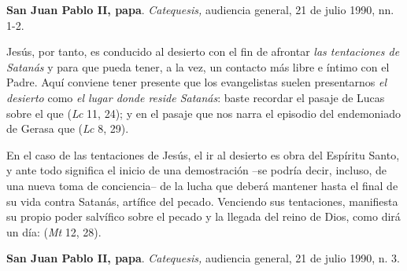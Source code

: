 \begin{patercite}\textbf{San Juan Pablo II, papa}. \textit{Catequesis,} audiencia general, 21 de julio 1990, nn. 1-2.\end{patercite}

\begin{patercite}[+] Jesús, por tanto, es conducido al desierto con el fin de afrontar \textit{las tentaciones de Satanás} y para que pueda tener, a la vez, un contacto más libre e íntimo con el Padre. Aquí conviene tener presente que los evangelistas suelen presentarnos \textit{el desierto} como \textit{el lugar donde reside Satanás}: baste recordar el pasaje de Lucas sobre el  que  (\textit{Lc} 11, 24); y en el pasaje que nos narra el episodio del endemoniado de Gerasa que  (\textit{Lc} 8, 29).\end{patercite}

\begin{patercite}En el caso de las tentaciones de Jesús, el ir al desierto es obra del Espíritu Santo, y ante todo significa el inicio de una demostración –se podría decir, incluso, de una nueva toma de conciencia– de la lucha que deberá mantener hasta el final de su vida contra Satanás, artífice del pecado. Venciendo sus tentaciones, manifiesta su propio poder salvífico sobre el pecado y la llegada del reino de Dios, como dirá un día:  (\textit{Mt} 12, 28).\end{patercite}

\begin{patercite}\textbf{San Juan Pablo II, papa}. \textit{Catequesis,} audiencia general, 21 de julio 1990, n. 3.\end{patercite}

